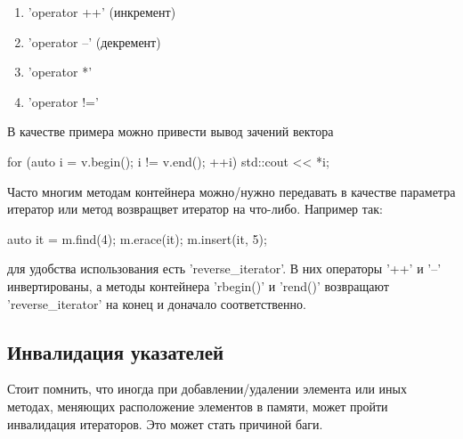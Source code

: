 \begin{enumerate}
	\item \cpp'operator ++' (инкремент)
	\item \cpp'operator --' (декремент)
	\item \cpp'operator *'
	\item \cpp'operator !='
\end{enumerate}

В качестве примера можно привести вывод зачений вектора
\begin{cppcode}
for (auto i = v.begin(); i != v.end(); ++i) {
	std::cout << *i;
}
\end{cppcode}

Часто многим методам контейнера можно/нужно передавать в качестве параметра итератор или метод возвращвет итератор на что-либо. Например так:
\begin{cppcode}
auto it = m.find(4);
m.erace(it);
m.insert(it, 5);
\end{cppcode}
для удобства использования есть \cpp'reverse_iterator'. В них операторы \cpp'++' и \cpp'--' инвертированы, 
а методы контейнера \cpp'rbegin()' и \cpp'rend()' возвращают \cpp'reverse_iterator' на конец и доначало соответственно.

\subsection{Инвалидация указателей}

Стоит помнить, что иногда при добавлении/удалении элемента или иных методах, меняющих расположение элементов в памяти, может пройти инвалидация итераторов. Это может стать причиной баги.
